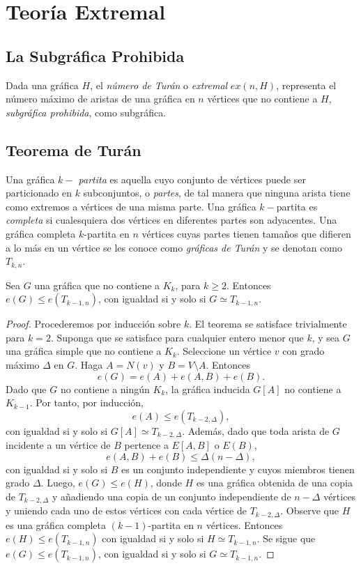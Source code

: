 \chapter{Teoría Extremal}

\section{La Subgráfica Prohibida}
Dada una gráfica $H$, el \textit{número de Turán} o \textit{extremal}
$ex(n, H)$, representa el número máximo de aristas de una gráfica en
$n$ vértices que no contiene a $H$, \textit{subgráfica prohibida},
como subgráfica.

\section{Teorema de Turán}
Una gráfica \textit{$k-$ partita} es aquella cuyo conjunto de
vértices puede ser particionado en $k$ subconjuntos, o
\textit{partes}, de tal manera que ninguna arista tiene como extremos
a vértices de una misma parte. Una gráfica $k-$partita es
\textit{completa} si cualesquiera dos vértices en diferentes partes
son adyacentes. Una gráfica completa $k$-partita en $n$ vértices
cuyas partes tienen tamaños que difieren a lo más en un vértice se
les conoce como  \textit{gráficas de Turán} y se denotan como $T_{k, n}$.

\begin{theorem} \label{turan}
  Sea $G$ una gráfica que no contiene a $K_k$, para $k \geq
  2$. Entonces $e(G) \leq e(T_{{k-1}, n})$, con igualdad si y solo si
  $G \simeq T_{{k-1}, n}$.
\end{theorem}

\begin{proof}
  Procederemos por inducción sobre $k$. El teorema se satisface
  trivialmente para $k=2$.  Suponga que se satisface para cualquier
  entero menor que $k$, y sea $G$ una gráfica simple que no contiene
  a $K_k$. Seleccione un vértice $v$ con grado máximo $\Delta$ en
  $G$. Haga $A = N(v)$ y $B = V \setminus A$. Entonces
  $$e(G) = e(A) + e(A, B) + e(B).$$
  Dado que $G$ no contiene a ningún $K_k$, la gráfica inducida $G[A]$
  no contiene a $K_{k-1}$. Por tanto, por inducción,
  $$e(A) \leq e(T_{k-2, \Delta}),$$
  con igualdad si y solo si $G[A] \simeq T_{{k-2}, \Delta}$. Además,
  dado que toda arista de $G$ incidente a un vértice de $B$ pertence
  a $E[A, B]$ o $E( B )$,
  $$e(A, B) + e(B) \leq \Delta (n - \Delta),$$
  con igualdad si y solo si $B$ es un conjunto independiente y cuyos
  miembros tienen grado $\Delta$. Luego, $e(G) \leq e(H)$, donde $H$
  es una gráfica obtenida de una copia de $T_{{k-2}, \Delta}$ y
  añadiendo una copia de un conjunto independiente de $n-\Delta$
  vértices y uniendo cada uno de estos vértices con cada vértice de
  $T_{{k-2}, \Delta}$. Observe que $H$ es una gráfica completa
  $(k-1)$-partita en $n$ vértices. Entonces $e(H) \leq e(T_{{k-1},
  n})$ con igualdad si y solo si $H \simeq T_{{k-1}, n}$. Se sigue
  que $e(G) \leq e(T_{k-1, n})$, con igualdad si y solo si $G \simeq
  T_{k-1, n}$.
\end{proof}

